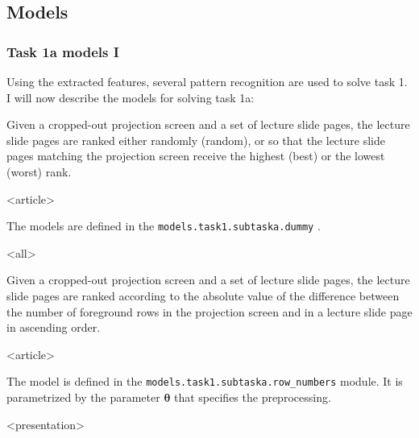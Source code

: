\subsection{Models}
\begin{frame}
\frametitle<presentation>{Task 1a models I}
Using the extracted features, several pattern recognition  are
used to solve task 1. I will now describe the models for solving task 1a:

\begin{description}[<+->]
  \item[Dummy models]
    Given a cropped-out projection screen and a set of lecture slide pages, the
    lecture slide pages are ranked either randomly (random), or so that the
    lecture slide pages matching the projection screen receive the highest
    (best) or the lowest (worst) rank.

\mode
<article>

    The models are defined in the
    \texttt{models.task1.subtaska.dummy} .

\mode
<all>

  \item[Row numbers]
    Given a cropped-out projection screen and a set of lecture slide
    pages, the lecture slide pages are ranked according to the absolute value of
    the difference between the number of foreground rows in the projection
    screen and in a lecture slide page in ascending order.

\mode
<article>

    The model is defined in the
    \texttt{models.task1.subtaska.row\_numbers} module.
    It is parametrized by the parameter $\bm\theta$ that specifies the
    preprocessing.

\mode
<presentation>

\end{description}
\end{frame}
